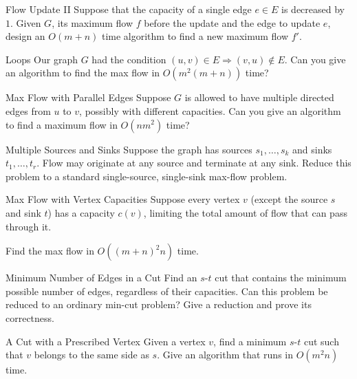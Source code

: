 \documentclass[aspectratio=169]{beamer}
\newcommand{\blankslides}{%
  \begin{frame}[plain]\end{frame}%
}
\begin{document}
\begin{frame}{Flow Update II}
  Suppose that the capacity of a single edge $e \in E$ is decreased by $1$. Given $G$, its maximum flow $f$ before the update and the edge to update $e$, design an $O(m+n)$ time algorithm to find a new maximum flow $f'$.
\end{frame}
\blankslides

\begin{frame}{Loops}
  Our graph $G$ had the condition $(u,v) \in E \Rightarrow (v,u) \notin E$. Can you give an algorithm to find the max flow in $O(m^2(m+n))$ time?
\end{frame}
\blankslides

\begin{frame}{Max Flow with Parallel Edges}
  Suppose $G$ is allowed to have multiple directed edges from $u$ to $v$, possibly with different capacities. Can you give an algorithm to find a maximum flow in $O(nm^2)$ time?
\end{frame}
\blankslides

\begin{frame}{Multiple Sources and Sinks}
  Suppose the graph has sources $s_1,\ldots,s_k$ and sinks $t_1,\ldots,t_r$. Flow may originate at any source and terminate at any sink. Reduce this problem to a standard single-source, single-sink max-flow problem.
\end{frame}
\blankslides

\begin{frame}{Max Flow with Vertex Capacities}
  Suppose every vertex $v$ (except the source $s$ and sink $t$) has a capacity $c(v)$, limiting the total amount of flow that can pass through it.

  \medskip
  Find the max flow in $O((m+n)^2 n)$ time.
\end{frame}
\blankslides

\begin{frame}{Minimum Number of Edges in a Cut}
  Find an $s$-$t$ cut that contains the minimum possible number of edges, regardless of their capacities. Can this problem be reduced to an ordinary min-cut problem? Give a reduction and prove its correctness.
\end{frame}
\blankslides

\begin{frame}{A Cut with a Prescribed Vertex}
  Given a vertex $v$, find a minimum $s$-$t$ cut such that $v$ belongs to the same side as $s$. Give an algorithm that runs in $O(m^2 n)$ time.
\end{frame}
\blankslides
\end{document}
